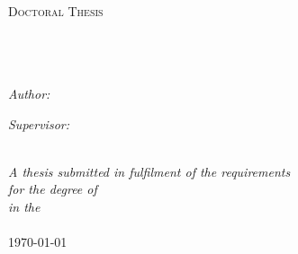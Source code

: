 \documentclass[
12pt, %
oneside, %
english, %
doublespacing, %
draft, %
nolistspacing, %
liststotoc, %
parskip, %
cmyk
]{MastersDoctoralThesis} %
\author{Teena Koshy} %
\begin{document}
\frontmatter %

\pagestyle{plain} %


\begin{titlepage}
\begin{center}

\textsc{\LARGE \univname}\\[1.5cm] %
\textsc{\Large Doctoral Thesis}\\[0.5cm] %

\HRule \\[0.4cm] %
{\huge \bfseries \ttitle}\\[0.4cm] %
\HRule \\[1.5cm] %
 
\begin{minipage}{0.4\textwidth}
\begin{flushleft} \large
\emph{Author:}\\
\authorname %
\end{flushleft}
\end{minipage}
\begin{minipage}{0.4\textwidth}
\begin{flushright} \large
\emph{Supervisor:} \\
\href{http://www.jamessmith.com}{\supname} %
\end{flushright}
\end{minipage}\\[3cm]
 
\large \textit{A thesis submitted in fulfilment of the requirements\\ for the degree of \degreename}\\[0.3cm] %
\textit{in the}\\[0.4cm]
\deptname\\[2cm] %
 
{\large \today}\\[4cm] %
 
\vfill
\end{center}
\end{titlepage}
\end{document}
